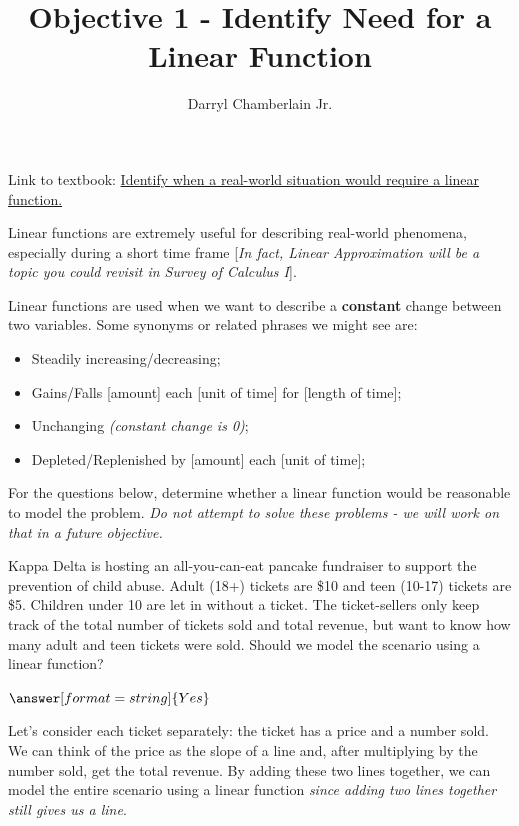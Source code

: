 \documentclass{ximera}
\author{Darryl Chamberlain Jr.}
\title{Objective 1 - Identify Need for a Linear Function}
\begin{document}
\begin{abstract}

\end{abstract}

\maketitle
 
Link to textbook: 
\href{https://cnx.org/contents/mwjClAV_@8.12:3PeE3KzR@10/Modeling-with-Linear-Functions}{Identify when a real-world situation would require a linear function.}
 

Linear functions are extremely useful for describing real-world phenomena, especially during a short time frame [\textit{In fact, Linear Approximation will be a topic you could revisit in Survey of Calculus I}]. 

Linear functions are used when we want to describe a \textbf{constant} change between two variables. Some synonyms or related phrases we might see are:
	\begin{itemize}
		\item Steadily increasing/decreasing;
		\item Gains/Falls [amount] each [unit of time] for [length of time];
		\item Unchanging \textit{(constant change is 0)};
		\item Depleted/Replenished by [amount] each [unit of time];
	\end{itemize}

For the questions below, determine whether a linear function would be reasonable to model the problem. \textit{Do not attempt to solve these problems - we will work on that in a future objective.}

\begin{question}
Kappa Delta is hosting an all-you-can-eat pancake fundraiser to support the prevention of child abuse. Adult (18+) tickets are \$10 and teen (10-17) tickets are \$5. Children under 10 are let in without a ticket. The ticket-sellers only keep track of the total number of tickets sold and total revenue, but want to know how many adult and teen tickets were sold. Should we model the scenario using a linear function?

$\answer[format=string]{Yes}$

\begin{feedback}
Let's consider each ticket separately: the ticket has a price and a number sold. We can think of the price as the slope of a line and, after multiplying by the number sold, get the total revenue. By adding these two lines together, we can model the entire scenario using a linear function \textit{since adding two lines together still gives us a line}.
\end{feedback}

\end{question}
\end{document}
